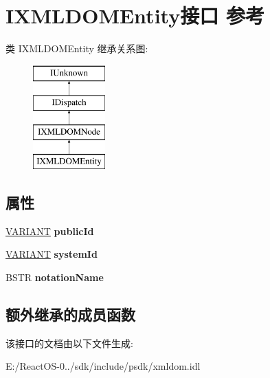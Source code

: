 \hypertarget{interface_i_x_m_l_d_o_m_entity}{}\section{I\+X\+M\+L\+D\+O\+M\+Entity接口 参考}
\label{interface_i_x_m_l_d_o_m_entity}
类 I\+X\+M\+L\+D\+O\+M\+Entity 继承关系图\+:\begin{figure}[H]
\begin{center}
\leavevmode
\includegraphics[height=4.000000cm]{interface_i_x_m_l_d_o_m_entity}
\end{center}
\end{figure}
\subsection*{属性}
\begin{DoxyCompactItemize}
\item 
\mbox{\label{interface_i_x_m_l_d_o_m_entity_a04bed9600259fe1ebdf1a430a6372f8d}} 
\hyperlink{structtag_v_a_r_i_a_n_t}{V\+A\+R\+I\+A\+NT} {\bfseries public\+Id}
\item 
\mbox{\label{interface_i_x_m_l_d_o_m_entity_a26c36c3bef3c00914a09cce61a9dba6f}} 
\hyperlink{structtag_v_a_r_i_a_n_t}{V\+A\+R\+I\+A\+NT} {\bfseries system\+Id}
\item 
\mbox{\label{interface_i_x_m_l_d_o_m_entity_a0d717ebd3db20f022365b197cd758b20}} 
B\+S\+TR {\bfseries notation\+Name}
\end{DoxyCompactItemize}
\subsection*{额外继承的成员函数}


该接口的文档由以下文件生成\+:\begin{DoxyCompactItemize}
\item 
E\+:/\+React\+O\+S-\/0../sdk/include/psdk/xmldom.\+idl\end{DoxyCompactItemize}
